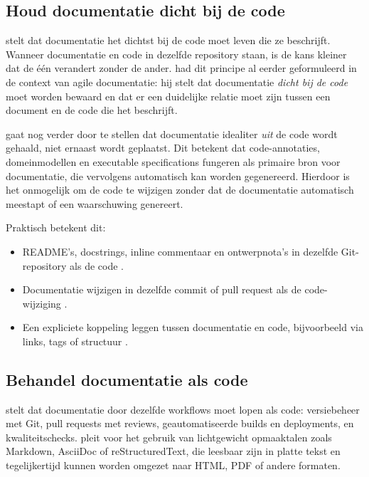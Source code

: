 \subsection{Houd documentatie dicht bij de code}
\textcite{gentle2017docslikecode} stelt dat documentatie het dichtst bij de code moet leven die ze beschrijft. Wanneer documentatie en code in dezelfde repository staan, is de kans kleiner dat de één verandert zonder de ander. \textcite{ruping2005agiledocumentation} had dit principe al eerder geformuleerd in de context van agile documentatie: hij stelt dat documentatie \textit{dicht bij de code} moet worden bewaard en dat er een duidelijke relatie moet zijn tussen een document en de code die het beschrijft.

\textcite{martraire2019livingdocumentation} gaat nog verder door te stellen dat documentatie idealiter \textit{uit} de code wordt gehaald, niet ernaast wordt geplaatst. Dit betekent dat code-annotaties, domeinmodellen en executable specifications fungeren als primaire bron voor documentatie, die vervolgens automatisch kan worden gegenereerd. Hierdoor is het onmogelijk om de code te wijzigen zonder dat de documentatie automatisch meestapt of een waarschuwing genereert.

Praktisch betekent dit:
\begin{itemize}
    \item README's, docstrings, inline commentaar en ontwerpnota's in dezelfde Git-repository als de code \autocite{gentle2017docslikecode}.
    \item Documentatie wijzigen in dezelfde commit of pull request als de code-wijziging \autocite{etter2016moderntechwriting}.
    \item Een expliciete koppeling leggen tussen documentatie en code, bijvoorbeeld via links, tags of structuur \autocite{bhatti2021docsdevelopers}.
\end{itemize}

\subsection{Behandel documentatie als code}
\textcite{gentle2017docslikecode} stelt dat documentatie door dezelfde workflows moet lopen als code: versiebeheer met Git, pull requests met reviews, geautomatiseerde builds en deployments, en kwaliteitschecks. \textcite{etter2016moderntechwriting} pleit voor het gebruik van lichtgewicht opmaaktalen zoals Markdown, AsciiDoc of reStructuredText, die leesbaar zijn in platte tekst en tegelijkertijd kunnen worden omgezet naar HTML, PDF of andere formaten.

